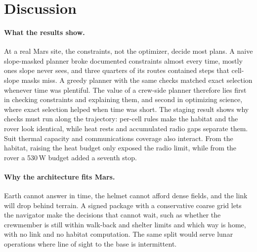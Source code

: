 \section{Discussion}
\label{sec:discussion}

\paragraph{What the results show.} At a real Mars site, the constraints, not the optimizer, decide most plans. A naive slope-masked planner broke documented constraints almost every time, mostly ones slope never sees, and three quarters of its routes contained steps that cell-slope masks miss. A greedy planner with the same checks matched exact selection whenever time was plentiful. The value of a crew-side planner therefore lies first in checking constraints and explaining them, and second in optimizing science, where exact selection helped when time was short. The staging result shows why checks must run along the trajectory: per-cell rules make the habitat and the rover look identical, while heat rests and accumulated radio gaps separate them. Suit thermal capacity and communications coverage also interact. From the habitat, raising the heat budget only exposed the radio limit, while from the rover a 530\,W budget added a seventh stop.

\paragraph{Why the architecture fits Mars.} Earth cannot answer in time, the helmet cannot afford dense fields, and the link will drop behind terrain. A signed package with a conservative coarse grid lets the navigator make the decisions that cannot wait, such as whether the crewmember is still within walk-back and shelter limits and which way is home, with no link and no habitat computation. The same split would serve lunar operations where line of sight to the base is intermittent.

